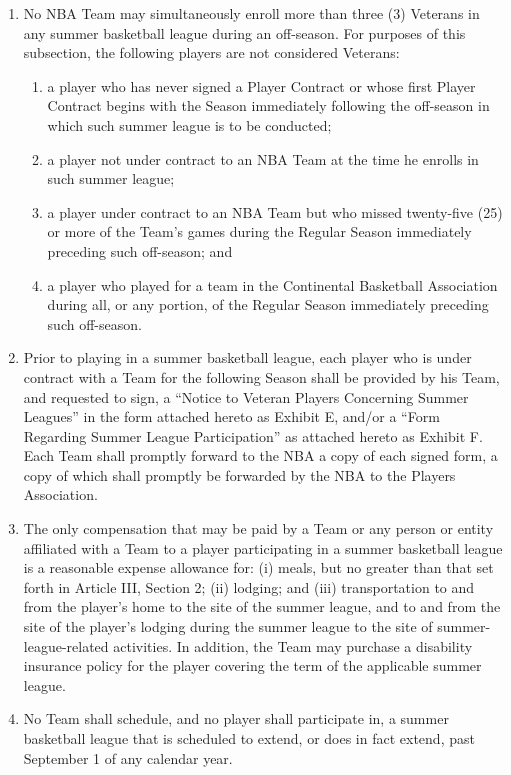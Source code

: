 \documentclass[
]{book}
\providecommand{\tightlist}{%
  \setlength{\itemsep}{0pt}\setlength{\parskip}{0pt}}
\begin{document}
\begin{enumerate}
\def\labelenumi{(\alph{enumi})}
\tightlist
\item
  No NBA Team may simultaneously enroll more than three (3) Veterans in any summer basketball league during an off-season. For purposes of this subsection, the following players are not considered Veterans:

  \begin{enumerate}
  \def\labelenumii{(\roman{enumii})}
  \tightlist
  \item
    a player who has never signed a Player Contract or whose first Player Contract begins with the Season immediately following the off-season in which such summer league is to be conducted;
  \item
    a player not under contract to an NBA Team at the time he enrolls in such summer league;
  \item
    a player under contract to an NBA Team but who missed twenty-five (25) or more of the Team's games during the Regular Season immediately preceding such off-season; and
  \item
    a player who played for a team in the Continental Basketball Association during all, or any portion, of the Regular Season immediately preceding such off-season.
  \end{enumerate}
\item
  Prior to playing in a summer basketball league, each player who is under contract with a Team for the following Season shall be provided by his Team, and requested to sign, a ``Notice to Veteran Players Concerning Summer Leagues'' in the form attached hereto as Exhibit E, and/or a ``Form Regarding Summer League Participation'' as attached hereto as Exhibit F. Each Team shall promptly forward to the NBA a copy of each signed form, a copy of which shall promptly be forwarded by the NBA to the Players Association.
\item
  The only compensation that may be paid by a Team or any person or entity affiliated with a Team to a player participating in a summer basketball league is a reasonable expense allowance for: (i) meals, but no greater than that set forth in Article III, Section 2; (ii) lodging; and (iii) transportation to and from the player's home to the site of the summer league, and to and from the site of the player's lodging during the summer league to the site of summer-league-related activities. In addition, the Team may purchase a disability insurance policy for the player covering the term of the applicable summer league.
\item
  No Team shall schedule, and no player shall participate in, a summer basketball league that is scheduled to extend, or does in fact extend, past September 1 of any calendar year.
\end{enumerate}
\end{document}
